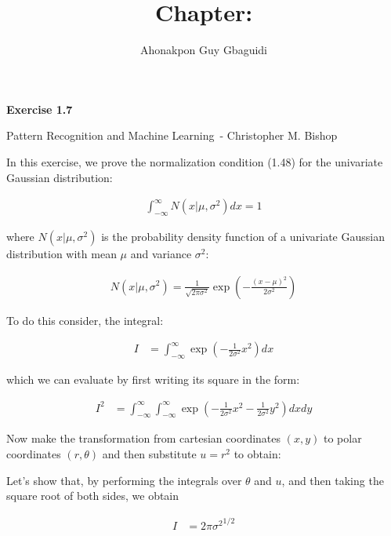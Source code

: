\documentclass{article}
\title{Chapter: \ChapterName}
\author{Ahonakpon Guy Gbaguidi}
\date{}
\newcommand{\BookName}{Pattern Recognition and Machine Learning}
\newcommand{\BookAuthor}{Christopher M. Bishop}
\newcommand{\ExerciseID}{1.7}
\begin{document}
\maketitle

\begin{center}
  \large\textbf{Exercise \ExerciseID}

  \vspace{0.5em}

  \normalsize\BookName\ - \BookAuthor
\end{center}

\begin{tcolorbox}[breakable,colback=gray!5,colframe=gray!60,title=Solution]
In this exercise, we prove the normalization condition (1.48)
for the univariate Gaussian distribution:

\begin{align*}
  \int_{-\infty}^{\infty} N(x|\mu, \sigma^2) dx = 1
\end{align*}

where $N(x|\mu, \sigma^2)$ is the probability density function of a univariate Gaussian distribution with mean $\mu$ and variance $\sigma^2$:

\begin{align*}
  N(x|\mu, \sigma^2) = \frac{1}{\sqrt{2\pi\sigma^2}} \exp\left( -\frac{(x-\mu)^2}{2\sigma^2} \right)
\end{align*}

To do this consider, the integral:

\begin{align*}
  I &= \int_{-\infty}^{\infty}  \exp\left( -\frac{1}{2\sigma^2} x^2 \right) dx
\end{align*}

which we can evaluate by first writing its square in the form:

\begin{align*}
  I^2 &= \int_{-\infty}^{\infty} \int_{-\infty}^{\infty}  \exp\left( -\frac{1}{2\sigma^2} x^2 -\frac{1}{2\sigma^2} y^2 \right) dx dy
\end{align*}

Now make the transformation from cartesian coordinates $(x, y)$ to polar coordinates $(r, \theta)$ and then 
substitute $u = r^2$ to obtain:

Let's show that, by performing the integrals over $\theta$ and $u$, and then taking the square root of both sides,
we obtain 

\begin{align*}
  I &= {2\pi\sigma^2}^{1/2}
\end{align*}


\end{tcolorbox}
\end{document}

